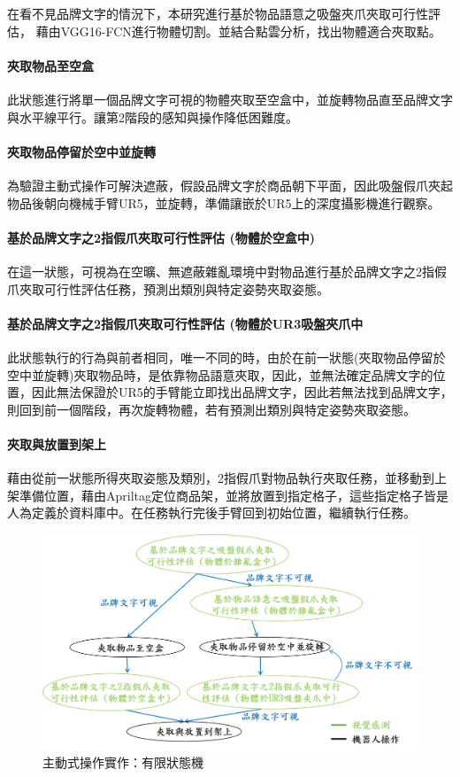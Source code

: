 在看不見品牌文字的情況下，本研究進行基於物品語意之吸盤夾爪夾取可行性評估，
藉由VGG16-FCN進行物體切割。並結合點雲分析，找出物體適合夾取點。

\paragraph{夾取物品至空盒}
此狀態進行將單一個品牌文字可視的物體夾取至空盒中，並旋轉物品直至品牌文字與水平線平行。讓第2階段的感知與操作降低困難度。

\paragraph{夾取物品停留於空中並旋轉}
為驗證主動式操作可解決遮蔽，假設品牌文字於商品朝下平面，因此吸盤假爪夾起物品後朝向機械手臂UR5，並旋轉，準備讓嵌於UR5上的深度攝影機進行觀察。

\paragraph{基於品牌文字之2指假爪夾取可行性評估 (物體於空盒中)}
在這一狀態，可視為在空曠、無遮蔽雜亂環境中對物品進行基於品牌文字之2指假爪夾取可行性評估任務，預測出類別與特定姿勢夾取姿態。

\paragraph{基於品牌文字之2指假爪夾取可行性評估 (物體於UR3吸盤夾爪中}
此狀態執行的行為與前者相同，唯一不同的時，由於在前一狀態(夾取物品停留於空中並旋轉)夾取物品時，是依靠物品語意夾取，因此，並無法確定品牌文字的位置，因此無法保證於UR5的手臂能立即找出品牌文字，因此若無法找到品牌文字，則回到前一個階段，再次旋轉物體，若有預測出類別與特定姿勢夾取姿態。

\paragraph{夾取與放置到架上}
藉由從前一狀態所得夾取姿態及類別，2指假爪對物品執行夾取任務，並移動到上架準備位置，藉由Apriltag定位商品架，並將放置到指定格子，這些指定格子皆是人為定義於資料庫中。在任務執行完後手臂回到初始位置，繼續執行任務。


\begin{figure}[ht]
	\centering
	\includegraphics[height=!, width=1.0\linewidth, keepaspectratio=true]
	{./figures/FSM.jpg}
  \caption{主動式操作實作：有限狀態機}
  \label{figure:fsm}
\end{figure}
